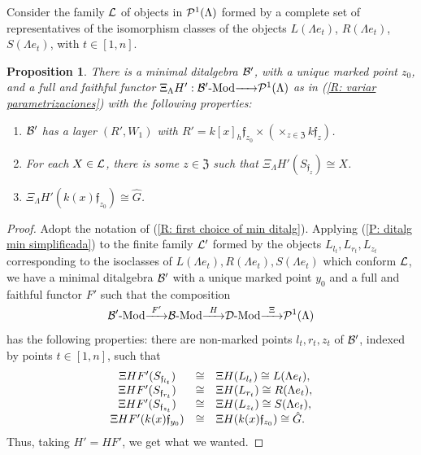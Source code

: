 \documentclass{article}
\newtheorem{proposition}[theorem]{Proposition}
\theoremstyle{definition}
\newcommand{\Mod}{{ \rm Mod }}
\renewcommand{\frak}{\mathfrak}
\newcommand{\g}{\hbox{-}}
\newcommand{\rightmap}[1]{\smash{\mathop{\hbox to 
20pt{\rightarrowfill}}\limits^{#1}}}
\begin{document}
Consider the family ${\cal L}$ of objects in ${\cal P}^1(\Lambda)$ formed by a complete set of representatives of the isomorphism classes of the objects $L(\Lambda e_t)$, $R(\Lambda e_t)$, $S(\Lambda e_t)$, with $t\in [1,n]$. 

\begin{proposition}\label{P: el funtor F}
There is a minimal ditalgebra 
${\cal B}'$, 
with a unique marked point $z_0$, and a full and faithful functor $\Xi_\Lambda H':  {\cal B}'\g\Mod \rightmap{} {\cal P}^1(\Lambda)$ as in (\ref{R: variar parametrizaciones})
with the following properties:
\begin{enumerate}
\item ${\cal B}'$ has a layer 
$(R', W_1)$ with $R' = k[x]_h\frak{f}_{z_0} \times\left( \times_{z\in \frak{Z}} k\frak{f}_z\right)$.
\item For each $X\in {\cal L}$, there is some $z\in \frak{Z}$ such that $\Xi_\Lambda H'(S_{\frak{f}_z})\cong X$.
\item  $ \Xi_\Lambda H'(k(x)\frak{f}_{z_ 0}) \cong \hat{G}$. 
\end{enumerate}
\end{proposition}

\begin{proof} Adopt the notation of (\ref{R: first choice of min ditalg}). Applying (\ref{P: ditalg min simplificada}) to the finite family ${\cal L}'$ formed by the objects $L_{l_t}, L_{r_t}, L_{z_t}$ corresponding to the isoclasses of $L(\Lambda e_t), R(\Lambda e_t), S(\Lambda e_t)$ which conform ${\cal L}$, we have a minimal ditalgebra ${\cal B}'$ with a unique marked point $y_0$ and a full and  faithful functor  
$F'$ such that the composition 
$${\cal B}'\g\Mod\rightmap{F'}{\cal B}\g\Mod\rightmap{H}{\cal D}\g\Mod\rightmap{\Xi}{\cal P}^1(\Lambda)$$
has the following properties: there are non-marked points $l_t, r_t, z_t$ of ${\cal B}'$, indexed by points $t\in [1,n]$, such that
$$\begin{matrix}\Xi HF'(S_{\frak{f}_{l_t}})&\cong& \Xi H(L_{l_t})\cong L(\Lambda e_t),\hfill\\  
\Xi HF'(S_{\frak{f}_{r_t}})&\cong& \Xi H(L_{r_t})\cong R(\Lambda e_t),\hfill\\ 
\Xi HF'(S_{\frak{f}_{z_t}})&\cong& \Xi H(L_{z_t})\cong S(\Lambda e_t),\hfill\\
\Xi HF'(k(x)\frak{f}_{y_0})&\cong& \Xi H (k(x)\frak{f}_{z_0})\cong \hat{G}.\hfill
\end{matrix}$$
Thus, taking $H'=HF'$, we get what we wanted.  
\end{proof}
\end{document}
